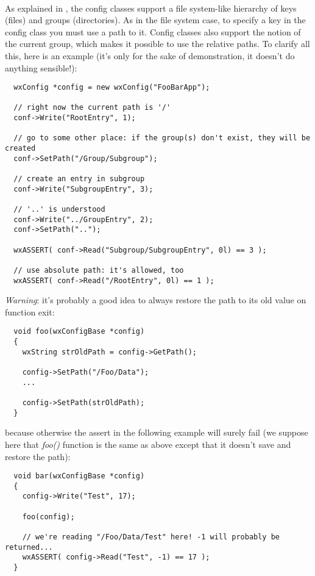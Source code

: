 
\\


As explained in , the config classes
support a file system-like hierarchy of keys (files) and groups (directories).
As in the file system case, to specify a key in the config class you must use
a path to it. Config classes also support the notion of the current group,
which makes it possible to use the relative paths. To clarify all this, here
is an example (it's only for the sake of demonstration, it doesn't do anything
sensible!):

\begin{verbatim}
  wxConfig *config = new wxConfig("FooBarApp");

  // right now the current path is '/'
  conf->Write("RootEntry", 1);

  // go to some other place: if the group(s) don't exist, they will be created
  conf->SetPath("/Group/Subgroup");

  // create an entry in subgroup
  conf->Write("SubgroupEntry", 3);

  // '..' is understood
  conf->Write("../GroupEntry", 2);
  conf->SetPath("..");

  wxASSERT( conf->Read("Subgroup/SubgroupEntry", 0l) == 3 );

  // use absolute path: it's allowed, too
  wxASSERT( conf->Read("/RootEntry", 0l) == 1 );
\end{verbatim}

{\it Warning}: it's probably a good idea to always restore the path to its
old value on function exit:

\begin{verbatim}
  void foo(wxConfigBase *config)
  {
    wxString strOldPath = config->GetPath();

    config->SetPath("/Foo/Data");
    ...

    config->SetPath(strOldPath);
  }
\end{verbatim}

because otherwise the assert in the following example will surely fail
(we suppose here that {\it foo()} function is the same as above except that it
doesn't save and restore the path):

\begin{verbatim}
  void bar(wxConfigBase *config)
  {
    config->Write("Test", 17);

    foo(config);

    // we're reading "/Foo/Data/Test" here! -1 will probably be returned...
    wxASSERT( config->Read("Test", -1) == 17 );
  }
\end{verbatim}


